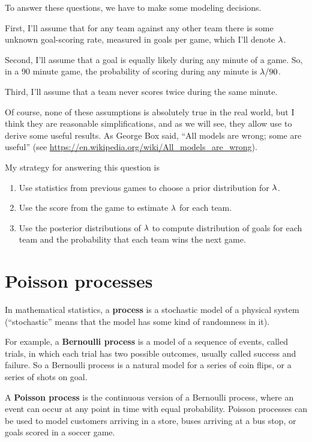\documentclass[12pt]{book}
\theoremstyle{exercise}
\begin{document}
To answer these questions, we have to make some modeling decisions.

First, I'll assume that for any team against any other team there is some unknown goal-scoring rate, measured in goals per game, which I'll denote
$\mathtt{\lambda}$.

Second, I'll assume that a goal is equally likely during any minute of a game.  So, in a 90 minute game, the probability of scoring during any minute is $\mathtt{\lambda} / 90$.

Third, I'll assume that a team never scores twice during the same minute.

Of course, none of these assumptions is absolutely true in the real world, but I think they are reasonable simplifications, and as we will see, they allow use to derive some useful results.
As George Box said, ``All models are wrong; some are useful''
(see \url{https://en.wikipedia.org/wiki/All_models_are_wrong}).

My strategy for answering this question is

\begin{enumerate}

\item Use statistics from previous games to choose a prior
distribution for $\mathtt{\lambda}$.

\item Use the score from the game to estimate $\mathtt{\lambda}$ for each team.

\item Use the posterior distributions of $\mathtt{\lambda}$ to compute
distribution of goals for each team and the probability that each team wins
the next game.

\end{enumerate}

\section{Poisson processes}

In mathematical statistics, a {\bf process} is a stochastic model of a
physical system (``stochastic'' means that the model has some kind of
randomness in it).

For example, a {\bf Bernoulli process} is a model of a
sequence of events, called trials, in which each trial has two
possible outcomes, usually called success and failure.
So a Bernoulli process
is a natural model for a series of coin flips, or a series of shots on
goal.

A {\bf Poisson process} is the continuous version of a Bernoulli process,
where an event can occur at any point in time with equal probability.
Poisson processes can be used to model customers arriving in a store,
buses arriving at a bus stop, or goals scored in a soccer game.
\end{document}
